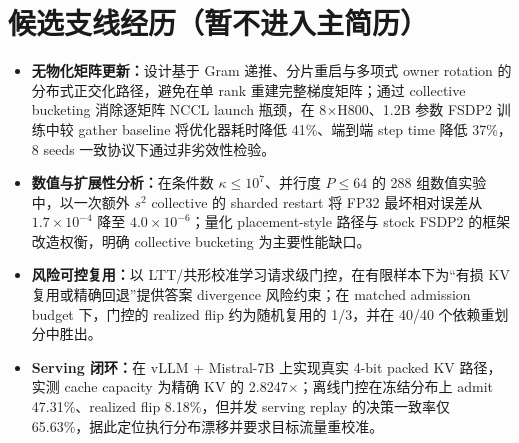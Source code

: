 \documentclass{resume}
\begin{document}
\pagestyle{empty}
\small

\section{候选支线经历（暂不进入主简历）}

\begin{itemize}
  \item \textbf{无物化矩阵更新：}设计基于 Gram 递推、分片重启与多项式 owner rotation 的分布式正交化路径，避免在单 rank 重建完整梯度矩阵；通过 collective bucketing 消除逐矩阵 NCCL launch 瓶颈，在 8$\times$H800、1.2B 参数 FSDP2 训练中较 gather baseline 将优化器耗时降低 41\%、端到端 step time 降低 37\%，8 seeds 一致协议下通过非劣效性检验。
  \item \textbf{数值与扩展性分析：}在条件数 $\kappa\le10^7$、并行度 $P\le64$ 的 288 组数值实验中，以一次额外 $s^2$ collective 的 sharded restart 将 FP32 最坏相对误差从 $1.7\times10^{-4}$ 降至 $4.0\times10^{-6}$；量化 placement-style 路径与 stock FSDP2 的框架改造权衡，明确 collective bucketing 为主要性能缺口。
\end{itemize}

\begin{itemize}
  \item \textbf{风险可控复用：}以 LTT/共形校准学习请求级门控，在有限样本下为“有损 KV 复用或精确回退”提供答案 divergence 风险约束；在 matched admission budget 下，门控的 realized flip 约为随机复用的 1/3，并在 40/40 个依赖重划分中胜出。
  \item \textbf{Serving 闭环：}在 vLLM + Mistral-7B 上实现真实 4-bit packed KV 路径，实测 cache capacity 为精确 KV 的 2.8247$\times$；离线门控在冻结分布上 admit 47.31\%、realized flip 8.18\%，但并发 serving replay 的决策一致率仅 65.63\%，据此定位执行分布漂移并要求目标流量重校准。
\end{itemize}
\end{document}
